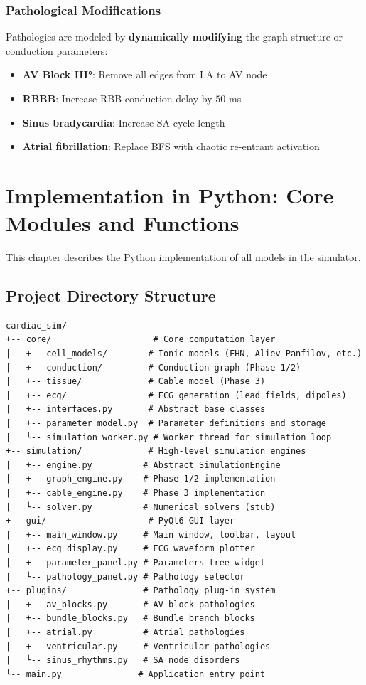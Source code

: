 \documentclass[12pt,a4paper,oneside]{book}
\begin{document}
\subsection{Pathological Modifications}

Pathologies are modeled by \textbf{dynamically modifying} the graph structure or conduction parameters:

\begin{itemize}
    \item \textbf{AV Block III°}: Remove all edges from LA to AV node
    \item \textbf{RBBB}: Increase RBB conduction delay by $50$ ms
    \item \textbf{Sinus bradycardia}: Increase SA cycle length
    \item \textbf{Atrial fibrillation}: Replace BFS with chaotic re-entrant activation
\end{itemize}

\chapter{Implementation in Python: Core Modules and Functions}

This chapter describes the Python implementation of all models in the simulator.

\section{Project Directory Structure}

\begin{lstlisting}
cardiac_sim/
+-- core/                    # Core computation layer
|   +-- cell_models/        # Ionic models (FHN, Aliev-Panfilov, etc.)
|   +-- conduction/         # Conduction graph (Phase 1/2)
|   +-- tissue/             # Cable model (Phase 3)
|   +-- ecg/                # ECG generation (lead fields, dipoles)
|   +-- interfaces.py       # Abstract base classes
|   +-- parameter_model.py  # Parameter definitions and storage
|   └-- simulation_worker.py # Worker thread for simulation loop
+-- simulation/             # High-level simulation engines
|   +-- engine.py          # Abstract SimulationEngine
|   +-- graph_engine.py    # Phase 1/2 implementation
|   +-- cable_engine.py    # Phase 3 implementation
|   └-- solver.py          # Numerical solvers (stub)
+-- gui/                    # PyQt6 GUI layer
|   +-- main_window.py     # Main window, toolbar, layout
|   +-- ecg_display.py     # ECG waveform plotter
|   +-- parameter_panel.py # Parameters tree widget
|   └-- pathology_panel.py # Pathology selector
+-- plugins/               # Pathology plug-in system
|   +-- av_blocks.py       # AV block pathologies
|   +-- bundle_blocks.py   # Bundle branch blocks
|   +-- atrial.py          # Atrial pathologies
|   +-- ventricular.py     # Ventricular pathologies
|   └-- sinus_rhythms.py   # SA node disorders
└-- main.py               # Application entry point
\end{lstlisting}
\end{document}
